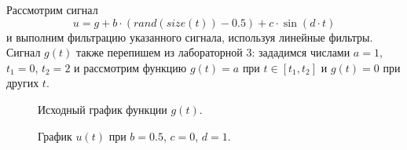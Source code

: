 \documentclass[a5paper, 10pt]{article}
\theoremstyle{definition}
\theoremstyle{plain}
\theoremstyle{remark}
\begin{document}
Рассмотрим сигнал $$u = g + b \cdot (rand(size(t)) - 0.5) + c \cdot \sin (d \cdot t)$$
и выполним фильтрацию указанного сигнала, используя линейные фильтры.\\
 Сигнал $g(t)$ также перепишем из лабораторной 3: зададимся числами $a=1$, $t_1 = 0$, $t_2 = 2$ и рассмотрим функцию $g(t) = a$ при $t \in [t_1, t_2]$ и $g(t) = 0$ при других $t$.

\begin{figure}[h!]
\caption{Исходный график функции $g(t)$.}
\end{figure}

\begin{figure}[h!]
\caption{График $u(t)$ при $b=0.5$, $c = 0$, $d = 1$.}
\end{figure}
\end{document}
